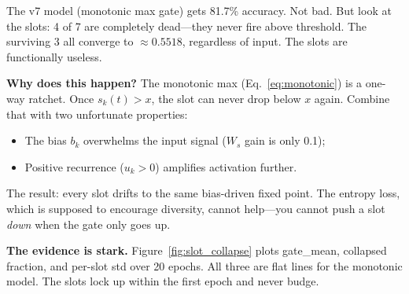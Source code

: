 \documentclass[conference]{IEEEtran}
\begin{document}
The v7 model (monotonic max gate) gets 81.7\% accuracy. Not bad.
But look at the slots: 4 of 7 are completely dead---they never
fire above threshold. The surviving 3 all converge to
$\approx 0.5518$, regardless of input. The slots are
functionally useless.

\textbf{Why does this happen?}
The monotonic max (Eq.~\ref{eq:monotonic}) is a one-way ratchet.
Once $s_k(t) > x$, the slot can never drop below $x$ again.
Combine that with two unfortunate properties:
\begin{itemize}[nosep]
    \item The bias $b_k$ overwhelms the input signal
          ($W_s$ gain is only 0.1);
    \item Positive recurrence ($u_k > 0$) amplifies activation
          further.
\end{itemize}
The result: every slot drifts to the same bias-driven fixed
point. The entropy loss, which is supposed to encourage
diversity, cannot help---you cannot push a slot \emph{down}
when the gate only goes up.

\textbf{The evidence is stark.}
Figure~\ref{fig:slot_collapse} plots gate\_mean, collapsed
fraction, and per-slot std over 20 epochs. All three are flat
lines for the monotonic model. The slots lock up within the
first epoch and never budge.
\end{document}
